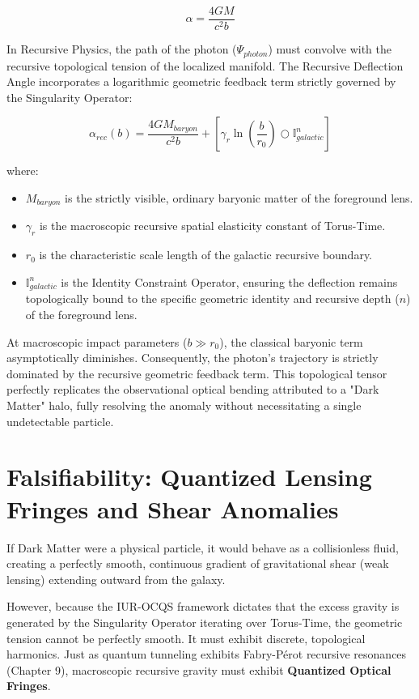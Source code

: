 \documentclass[12pt,openany]{book}
\begin{document}
\begin{equation}
\alpha = \frac{4GM}{c^2 b}
\end{equation}

In Recursive Physics, the path of the photon ($\Psi_{photon}$) must convolve with the recursive topological tension of the localized manifold. The Recursive Deflection Angle incorporates a logarithmic geometric feedback term strictly governed by the Singularity Operator:

\begin{equation}
\alpha_{rec}(b) = \frac{4GM_{baryon}}{c^2 b} + \left[ \gamma_r \ln\left(\frac{b}{r_0}\right) \bigcirc \mathbb{I}_{galactic}^n \right]
\end{equation}

where:
\begin{itemize}
    \item $M_{baryon}$ is the strictly visible, ordinary baryonic matter of the foreground lens.
    \item $\gamma_r$ is the macroscopic recursive spatial elasticity constant of Torus-Time.
    \item $r_0$ is the characteristic scale length of the galactic recursive boundary.
    \item $\mathbb{I}_{galactic}^n$ is the Identity Constraint Operator, ensuring the deflection remains topologically bound to the specific geometric identity and recursive depth ($n$) of the foreground lens.
\end{itemize}

At macroscopic impact parameters ($b \gg r_0$), the classical baryonic term asymptotically diminishes. Consequently, the photon's trajectory is strictly dominated by the recursive geometric feedback term. This topological tensor perfectly replicates the observational optical bending attributed to a "Dark Matter" halo, fully resolving the anomaly without necessitating a single undetectable particle.

\section[Falsifiability]{Falsifiability: Quantized Lensing Fringes and Shear Anomalies}
If Dark Matter were a physical particle, it would behave as a collisionless fluid, creating a perfectly smooth, continuous gradient of gravitational shear (weak lensing) extending outward from the galaxy. 

However, because the IUR-OCQS framework dictates that the excess gravity is generated by the Singularity Operator iterating over Torus-Time, the geometric tension cannot be perfectly smooth. It must exhibit discrete, topological harmonics. Just as quantum tunneling exhibits Fabry-Pérot recursive resonances (Chapter 9), macroscopic recursive gravity must exhibit \textbf{Quantized Optical Fringes}.
\end{document}
